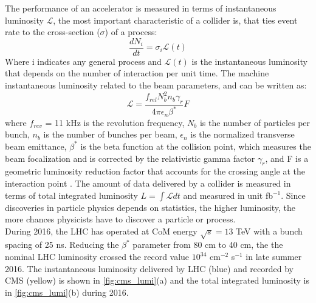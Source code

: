 The performance of an accelerator is measured in terms of instantaneous luminosity $\mathcal{L}$, the most important characteristic of a collider is, that ties event rate to the cross-section ($\sigma$) of a process:
\begin{equation}
\frac{dN_{i}}{dt} = \sigma_{i} \mathcal{L}(t)
\end{equation}
Where i indicates any general process and $\mathcal{L}(t)$ is the instantaneous luminosity that depends on the number of interaction per unit time. The machine instantaneous luminosity related to the beam parameters, and can be written as:
\begin{equation}
\mathcal{L} = \frac{f_{rel}N_{b}^{2}n_{b}\gamma_{r}}{4\pi\epsilon_{n}\beta^{\ast}}F
\end{equation}
where $f_{rev}$ = 11 kHz is the revolution frequency, $N_{b}$ is the number of particles per bunch, $n_{b}$ is the number of bunches per beam, $\epsilon_{n}$ is the normalized transverse beam emittance, $\beta^{\ast}$ is the beta function at the collision point, which measures the beam focalization and is corrected by the relativistic gamma factor $\gamma_{r}$, and F is a geometric luminosity reduction factor that accounts for the crossing angle at the interaction point \cite{lumi_formula}. The amount of data delivered by a collider is measured in terms of total integrated luminosity $L = \int\mathcal{L}dt$ and measured in unit fb$^{-1}$. Since discoveries in particle physics depends on statistics, the higher luminosity, the more chances physicists have to discover a particle or process.\\
During 2016, the LHC has operated at CoM energy $\sqrt{s} = 13$ TeV with a bunch spacing of 25 ns. Reducing the $\beta^{\ast}$ parameter from 80 cm to 40 cm, the the nominal LHC luminosity crossed the record value $10^{34}$ cm$^{-2}$ s$^{-1}$ in late summer 2016. The instantaneous luminosity delivered by LHC (blue) and recorded by CMS (yellow) is shown in \ref{fig:cms_lumi}(a) and the total integrated luminosity is in \ref{fig:cms_lumi}(b) during 2016.   


